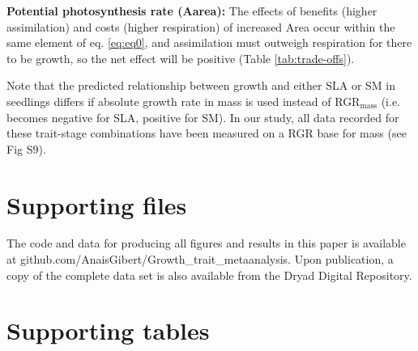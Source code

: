 \documentclass[a4paper]{article}\usepackage[]{graphicx}\usepackage[]{color}
\begin{document}
\begin{appendices}
\textbf{Potential photosynthesis rate (Aarea):} The effects of benefits (higher assimilation) and costs (higher respiration) of increased Area occur within the same element of eq. \ref{eq:eq0}, and assimilation must outweigh respiration for there to be growth, so the net effect will be positive (Table \ref{tab:trade-offs}).

Note that the predicted relationship between growth and either SLA or SM in seedlings differs if absolute growth rate in mass is used instead of RGR$_\textrm{mass}$ (i.e. becomes negative for SLA, positive for SM). In our study, all data recorded for these trait-stage combinations have been measured on a RGR base for mass (see Fig S9).


\clearpage

\section{Supporting files}\label{app:supp_info_files}

The code and data for producing all figures and results in this paper is available at github.com/AnaisGibert/Growth\_trait\_metaanalysis.  Upon publication, a copy of the complete data set is also available from the Dryad Digital Repository.

\section{Supporting tables}\label{app:supp_info_tables}

\linespread{1}


\end{appendices}
\end{document}
